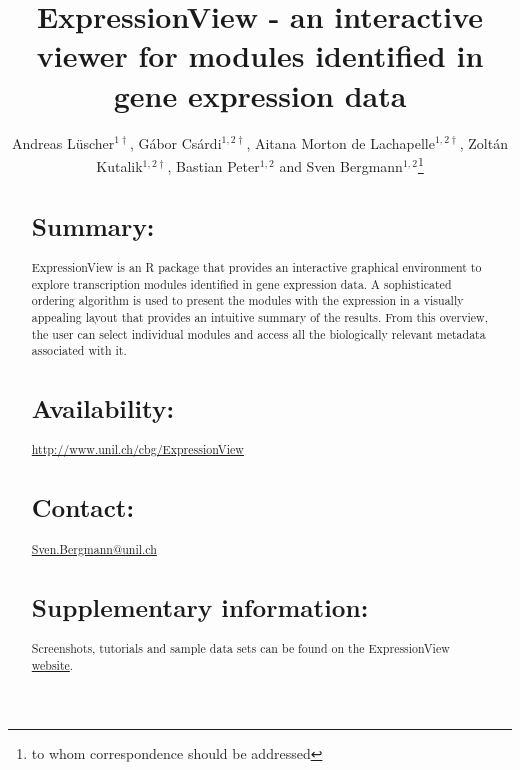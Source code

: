 \documentclass[round]{bioinfo}
\begin{document}
\application{}
\title[ExpressionView]{ExpressionView - an interactive viewer for
  modules identified in gene expression data} 
\author[Andreas L\"uscher, G\'abor Cs\'ardi, Aitana Morton de
Lachapelle, Zolt\'an Kutalik, and Sven Bergmann]{Andreas
  L\"uscher$^{1\dagger}$, G\'abor Cs\'ardi$^{1,2\dagger}$, Aitana Morton de
  Lachapelle$^{1,2\dagger}$, Zolt\'an Kutalik$^{1,2\dagger}$, 
  Bastian Peter$^{1,2}$
  and Sven Bergmann$^{1,2}$\footnote{to whom correspondence should be
    addressed}}  
\address{
  $^{1}$Swiss Institute of Bioinformatics, Lausanne, Switzerland\\
  $^{2}$Department of Medical Genetics, University of Lausanne,
  Lausanne, Switzerland\\
  +: equal contribution
}



\maketitle

\begin{abstract}

\section{Summary:}
ExpressionView is an R package that provides an interactive graphical
environment to explore transcription modules identified in gene expression
data. A sophisticated ordering algorithm is used to present the
modules with the expression in a visually appealing layout that provides an intuitive
summary of the results. From this overview, the user can select
individual modules and access all the biologically relevant metadata
associated with it.

\section{Availability:} 
\url{http://www.unil.ch/cbg/ExpressionView}

\section{Contact:} \href{Sven.Bergmann@unil.ch}{Sven.Bergmann@unil.ch}

\section{Supplementary information:}
Screenshots, tutorials and sample data sets can be found on the
ExpressionView \href{http://www.unil.ch/cbg/ExpressionView}{website}. 
\end{abstract}
\end{document}
